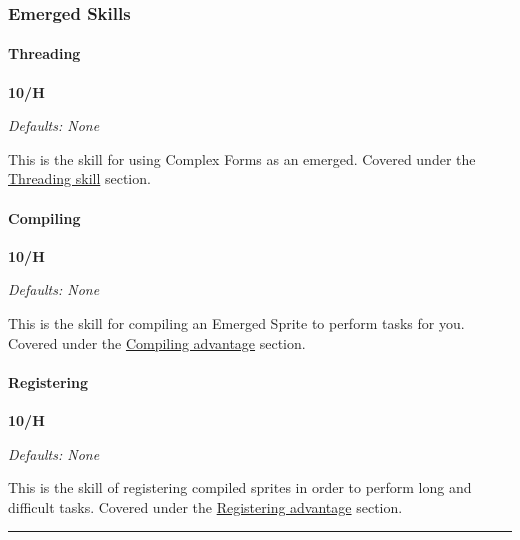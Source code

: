 \begin{multicols}{3}
	\subsubsection*{Emerged Skills}
	
	\paragraph{Threading}
	\begin{flushright}
		\textbf{10/H}
	\end{flushright}
	\textcolor{NavyBlue}{\textit{Defaults: None}}
	
	This is the skill for using Complex Forms as an emerged. Covered under the \hyperref[threading]{Threading skill} section.
	
	\paragraph{Compiling}
	\begin{flushright}
		\textbf{10/H}
	\end{flushright}
	\textcolor{NavyBlue}{\textit{Defaults: None}}
	
	This is the skill for compiling an Emerged Sprite to perform tasks for you. Covered under the \hyperref[compiling]{Compiling advantage} section.
	
	\paragraph{Registering}
	\begin{flushright}
		\textbf{10/H}
	\end{flushright}
	\textcolor{NavyBlue}{\textit{Defaults: None}}
	
	This is the skill of registering compiled sprites in order to perform long and difficult tasks. Covered under the \hyperref[registering]{Registering advantage} section.
	
\end{multicols}

\par\rule{\textwidth}{0.5pt} 

